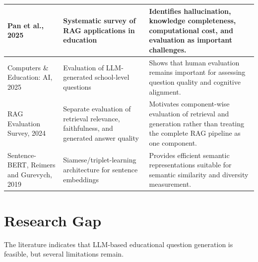 \documentclass[12pt,a4paper]{report}
\begin{document}
\begin{longtable}{P{0.22\textwidth} P{0.32\textwidth} P{0.38\textwidth}}
Pan et al., 2025
&
Systematic survey of RAG applications in education
&
Identifies hallucination, knowledge completeness, computational cost, and evaluation as important challenges.
\\
\midrule

Computers \& Education: AI, 2025
&
Evaluation of LLM-generated school-level questions
&
Shows that human evaluation remains important for assessing question quality and cognitive alignment.
\\
\midrule

RAG Evaluation Survey, 2024
&
Separate evaluation of retrieval relevance, faithfulness, and generated answer quality
&
Motivates component-wise evaluation of retrieval and generation rather than treating the complete RAG pipeline as one component.
\\
\midrule

Sentence-BERT, Reimers and Gurevych, 2019
&
Siamese/triplet-learning architecture for sentence embeddings
&
Provides efficient semantic representations suitable for semantic similarity and diversity measurement.
\\
\bottomrule
\end{longtable}

\section{Research Gap}

The literature indicates that LLM-based educational question generation is feasible, but several limitations remain.
\end{document}
